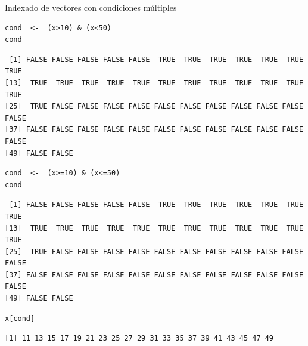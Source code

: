 \documentclass[xcolor={usenames,svgnames,dvipsnames}]{beamer}
\begin{document}
\begin{frame}[fragile,label=sec-2-1-11]{Indexado de vectores con condiciones múltiples}
 \lstset{language=R,label= ,caption= ,numbers=none}
\begin{lstlisting}
cond  <-  (x>10) & (x<50)
cond
\end{lstlisting}

\begin{verbatim}
 [1] FALSE FALSE FALSE FALSE FALSE  TRUE  TRUE  TRUE  TRUE  TRUE  TRUE  TRUE
[13]  TRUE  TRUE  TRUE  TRUE  TRUE  TRUE  TRUE  TRUE  TRUE  TRUE  TRUE  TRUE
[25]  TRUE FALSE FALSE FALSE FALSE FALSE FALSE FALSE FALSE FALSE FALSE FALSE
[37] FALSE FALSE FALSE FALSE FALSE FALSE FALSE FALSE FALSE FALSE FALSE FALSE
[49] FALSE FALSE
\end{verbatim}

\lstset{language=R,label= ,caption= ,numbers=none}
\begin{lstlisting}
cond  <-  (x>=10) & (x<=50)
cond
\end{lstlisting}

\begin{verbatim}
 [1] FALSE FALSE FALSE FALSE FALSE  TRUE  TRUE  TRUE  TRUE  TRUE  TRUE  TRUE
[13]  TRUE  TRUE  TRUE  TRUE  TRUE  TRUE  TRUE  TRUE  TRUE  TRUE  TRUE  TRUE
[25]  TRUE FALSE FALSE FALSE FALSE FALSE FALSE FALSE FALSE FALSE FALSE FALSE
[37] FALSE FALSE FALSE FALSE FALSE FALSE FALSE FALSE FALSE FALSE FALSE FALSE
[49] FALSE FALSE
\end{verbatim}

\lstset{language=R,label= ,caption= ,numbers=none}
\begin{lstlisting}
x[cond]
\end{lstlisting}

\begin{verbatim}
[1] 11 13 15 17 19 21 23 25 27 29 31 33 35 37 39 41 43 45 47 49
\end{verbatim}
\end{frame}
\end{document}
